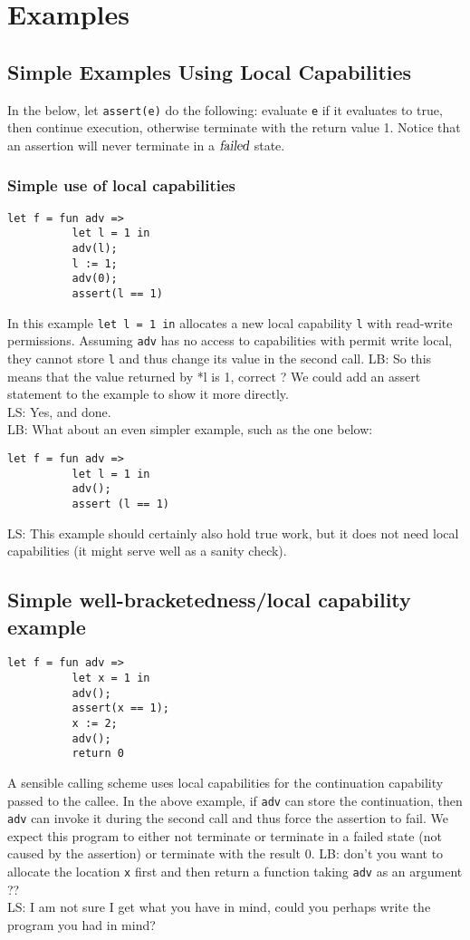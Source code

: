 \documentclass[a4paper]{article}
\newcommand\lau[1]{{\color{purple} \sf \footnotesize {LS: #1}}\\}
\newcommand\lars[1]{{\color{purple} \sf \footnotesize {LB: #1}}\\}
\newcommand{\failed}{\textsl{failed}}
\begin{document}
\section{Examples}
\label{sec:examples}
\subsection{Simple Examples Using Local Capabilities}
\label{subsec:example-loc-cap}
In the below, let \texttt{assert(e)} do the following: evaluate \texttt{e} if it evaluates to true, then continue execution, otherwise terminate with the return value 1. Notice that an assertion will never terminate in a $\failed$ state.
\subsubsection{Simple use of local capabilities}
\begin{verbatim}
let f = fun adv =>
          let l = 1 in
          adv(l);
          l := 1;
          adv(0);
          assert(l == 1)
\end{verbatim}
In this example \texttt{let l = 1 in} allocates a new local capability \texttt{l} with read-write permissions. Assuming \texttt{adv} has no access to capabilities with permit write local, they cannot store \texttt{l} and thus change its value in the second call.
\lars{So this means that the value returned by *l is 1, correct ? We
  could add an assert statement to the example to show it more directly.}
\lau{Yes, and done.}

\lars{What about an even simpler example, such as the one below:}
\begin{verbatim}
let f = fun adv =>
          let l = 1 in
          adv();
          assert (l == 1)
\end{verbatim}
\lau{This example should certainly also hold true work, but it does not need local capabilities (it might serve well as a sanity check). }

\subsection{Simple well-bracketedness/local capability example}
\begin{verbatim}
let f = fun adv =>
          let x = 1 in
          adv();
          assert(x == 1);
          x := 2;
          adv();
          return 0
\end{verbatim}
A sensible calling scheme uses local capabilities for the continuation capability passed to the callee. In the above example, if \texttt{adv} can store the continuation, then 
\texttt{adv} can invoke it during the second call and thus force the assertion to fail. We expect this program to either not terminate or terminate in a failed state (not caused by the assertion) or terminate with the result 0.
\lars{don't you want to allocate the location \texttt{x} first and then
  return a function taking \texttt{adv} as an argument ??}
\lau{I am not sure I get what you have in mind, could you perhaps write the program you had in mind?}
\end{document}
